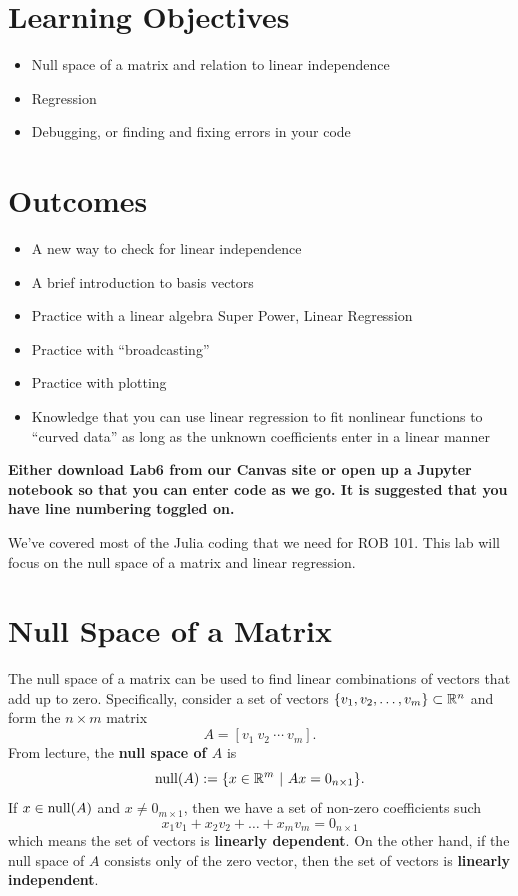 \section*{Learning Objectives}

\begin{itemize}
\item Null space of a matrix and relation to linear independence
\item  Regression
\item Debugging, or finding and fixing errors in your code
\end{itemize}

\section*{Outcomes} 
\begin{itemize}
\item A new way to check for linear independence
\item A brief introduction to basis vectors
\item Practice with a linear algebra Super Power, Linear Regression
\item Practice with ``broadcasting''
\item Practice with plotting
\item Knowledge that you can use linear regression to fit nonlinear functions to ``curved data''  as long as the unknown coefficients enter in a linear manner
\end{itemize}

\vspace*{1cm}

\textbf{Either download Lab6 from our Canvas site or open up a Jupyter notebook so that you can enter code as we go. It is suggested that you have line numbering toggled on.}  

\newpage

We've covered most of the Julia coding that we need for ROB 101. This lab will focus on the null space of a matrix and linear regression. 

\section{Null Space of a Matrix}

The null space of a matrix can be used to find linear combinations of vectors that add up to zero. Specifically, consider a set of vectors $\{ v_1, v_2, \ldots, v_m\} \subset \mathbb R^n$ and form the $n \times m$ matrix 
$$A = \left[ v_1 ~ v_2 ~\cdots ~v_m\right].$$ 
From lecture, the \textbf{null space of $A$} is 
$${\rm null}(A):=\{x \in \mathbb R^m~| ~ A x = 0_{n \times 1}   \}. $$
If $x \in {\rm null}(A)$ and $x \neq 0_{m \times 1} $, then we have a set of non-zero coefficients such 
$$x_1 v_1 + x_2 v_2 + \ldots + x_m v_m = 0_{n \times 1} $$
which means the set of vectors is \textbf{linearly dependent}. On the other hand, if the null space of $A$ consists only of the zero vector, then the set of vectors is \textbf{linearly independent}.

